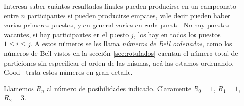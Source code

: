   Interesa saber cuántos resultados finales
  pueden producirse en un campeonato entre \(n\) participantes
  si pueden producirse empates,
  vale decir pueden haber varios primeros puestos,
  y en general varios en cada puesto.
  No hay puestos vacantes,
  si hay participantes en el puesto \(j\),
  los hay en todos los puestos \(1 \le i \le j\).
  A estos números se les llama \emph{números de Bell ordenados},
  como los números de Bell
  vistos en la sección~\ref{sec:rotulados}%
  cuentan el número total de particiones
  sin especificar el orden de las mismas,
  acá las estamos ordenando.
  Good~\cite{good75:_number_orders_cand_ties_permit}
  trata estos números en gran detalle.

  Llamemos \(R_n\) al número de posibilidades indicado.
  Claramente \(R_0 = 1\), \(R_1 = 1\), \(R_2 = 3\).

